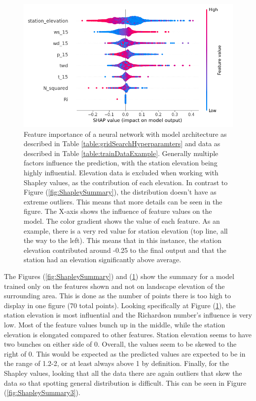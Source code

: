 \begin{figure}
    \centering
    \includegraphics[scale = 0.6]{Figures/shap_plots/summary_plot_190924_.png}
    \caption[Summary feature importance of a neural network using a larger distribution of data.]{Feature importance of a neural network with model architecture as described in Table \ref{table:gridSearchHyperparamters} and data as described in Table \ref{table:trainDataExample}. Generally multiple factors influence the prediction, with the station elevation being highly influential. Elevation data is excluded when working with Shapley values, as the contribution of each elevation. In contrast to Figure (\ref{fig:ShapleySummary}), the distribution doesn't have as extreme outliers. This means that more details can be seen in the figure. The X-axis shows the influence of feature values on the model. The color gradient shows the value of each feature. As an example, there is a very red value for station elevation (top line, all the way to the left). This means that in this instance, the station elevation contributed around -0.25 to the final output and that the station had an elevation significantly above average.}
    \label{fig:ShapleySummary2}
\end{figure}

The Figures (\ref{fig:ShapleySummary}) and (\ref{fig:ShapleySummary2}) show the summary for a model trained only on the features shown and not on landscape elevation of the surrounding area. This is done as the number of points there is too high to display in one figure (70 total points). Looking specifically at Figure (\ref{fig:ShapleySummary2}), the station elevation is most influential and the Richardson number's influence is very low. Most of the feature values bunch up in the middle, while the station elevation is elongated compared to other features. Station elevation seems to have two bunches on either side of 0. Overall, the values seem to be skewed to the right of 0. This would be expected as the predicted values are expected to be in the range of 1.2-2, or at least always above 1 by definition. Finally, for the Shapley values, looking that all the data there are again outliers that skew the data so that spotting general distribution is difficult. This can be seen in Figure (\ref{fig:ShapleySummary3}).

